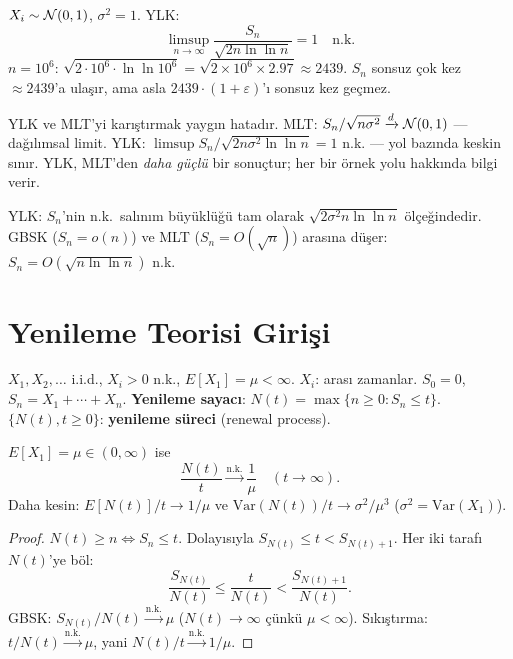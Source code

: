 \begin{ornek}
$X_i \sim \mathcal{N}(0,1)$, $\sigma^2 = 1$. YLK:
\[
  \limsup_{n\to\infty} \frac{S_n}{\sqrt{2n\ln\ln n}} = 1 \quad \text{n.k.}
\]
$n = 10^6$: $\sqrt{2 \cdot 10^6 \cdot \ln\ln 10^6} = \sqrt{2\times10^6 \times 2.97} \approx 2439$.
$S_n$ sonsuz çok kez $\approx 2439$'a ulaşır, ama asla $2439 \cdot (1+\varepsilon)$'ı
sonsuz kez geçmez.
\end{ornek}

\begin{hataanalizi}
YLK ve MLT'yi karıştırmak yaygın hatadır.
MLT: $S_n/\sqrt{n\sigma^2} \xrightarrow{d} \mathcal{N}(0,1)$ --- dağılımsal limit.
YLK: $\limsup S_n/\sqrt{2n\sigma^2\ln\ln n} = 1$ n.k. --- yol bazında keskin sınır.
YLK, MLT'den \emph{daha güçlü} bir sonuçtur; her bir örnek yolu hakkında bilgi verir.
\end{hataanalizi}

\begin{mikroozet}
YLK: $S_n$'nin n.k.\ salınım büyüklüğü tam olarak $\sqrt{2\sigma^2 n \ln\ln n}$ ölçeğindedir.
GBSK ($S_n = o(n)$) ve MLT ($S_n = O(\sqrt{n})$) arasına düşer: $S_n = O(\sqrt{n\ln\ln n})$ n.k.
\end{mikroozet}

\section{Yenileme Teorisi Girişi}
\label{sec:yenileme_teorisi}

\begin{tanim}
\label{def:yenileme_sureci}
$X_1, X_2, \ldots$ i.i.d., $X_i > 0$ n.k., $E[X_1] = \mu < \infty$.
$X_i$: arası zamanlar. $S_0 = 0$, $S_n = X_1 + \cdots + X_n$.
\textbf{Yenileme sayacı}: $N(t) = \max\{n \geq 0 : S_n \leq t\}$.
$\{N(t), t \geq 0\}$: \textbf{yenileme süreci} (renewal process).
\end{tanim}

\begin{teorem}
\label{thm:temel_yenileme}
$E[X_1] = \mu \in (0,\infty)$ ise
\[
  \frac{N(t)}{t} \xrightarrow{\text{n.k.}} \frac{1}{\mu} \quad (t \to \infty).
\]
Daha kesin: $E[N(t)]/t \to 1/\mu$ ve $\mathrm{Var}(N(t))/t \to \sigma^2/\mu^3$
($\sigma^2 = \mathrm{Var}(X_1)$).
\end{teorem}

\begin{proof}
$N(t) \geq n \Leftrightarrow S_n \leq t$. Dolayısıyla $S_{N(t)} \leq t < S_{N(t)+1}$.
Her iki tarafı $N(t)$'ye böl:
\[
  \frac{S_{N(t)}}{N(t)} \leq \frac{t}{N(t)} < \frac{S_{N(t)+1}}{N(t)}.
\]
GBSK: $S_{N(t)}/N(t) \xrightarrow{\text{n.k.}} \mu$ ($N(t) \to \infty$ çünkü $\mu < \infty$).
Sıkıştırma: $t/N(t) \xrightarrow{\text{n.k.}} \mu$, yani $N(t)/t \xrightarrow{\text{n.k.}} 1/\mu$.
\end{proof}

